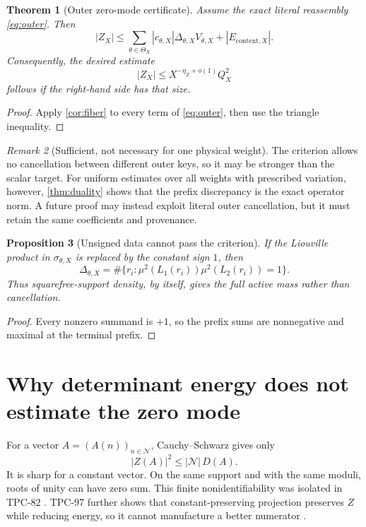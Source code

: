 \documentclass[11pt,a4paper]{article}
\newtheorem{theorem}{Theorem}[section]
\newtheorem{proposition}[theorem]{Proposition}
\theoremstyle{definition}
\theoremstyle{remark}
\newtheorem{remark}[theorem]{Remark}
\newcommand{\cN}{\mathcal N}
\begin{document}
\begin{theorem}[Outer zero-mode certificate]
\label{thm:outer}
Assume the exact literal reassembly \eqref{eq:outer}.  Then
\[
 \boxed{
 |Z_X|
 \le
 \sum_{\theta\in\Theta_X}
 |c_{\theta,X}|
 \Delta_{\theta,X}V_{\theta,X}
 +|E_{\mathrm{content},X}|.}
\]
Consequently, the desired estimate
\[
 |Z_X|\le X^{-\eta_Z+o(1)}Q_X^2
\]
follows if the right-hand side has that size.
\end{theorem}

\begin{proof}
Apply \cref{cor:fiber} to every term of
\eqref{eq:outer}, then use the triangle inequality.
\end{proof}

\begin{remark}[Sufficient, not necessary for one physical weight]
The criterion allows no cancellation between different outer keys,
so it may be stronger than the scalar target.  For uniform estimates
over all weights with prescribed variation, however,
\cref{thm:duality} shows that the prefix discrepancy is the exact
operator norm.  A future proof may instead exploit literal outer
cancellation, but it must retain the same coefficients and
provenance.
\end{remark}

\begin{proposition}[Unsigned data cannot pass the criterion]
\label{prop:unsigned}
If the Liouville product in \(\sigma_{\theta,X}\) is replaced by the
constant sign \(1\), then
\[
 \Delta_{\theta,X}
 =
 \#\{r_i:\mu^2(L_1(r_i))\mu^2(L_2(r_i))=1\}.
\]
Thus squarefree-support density, by itself, gives the full active
mass rather than cancellation.
\end{proposition}

\begin{proof}
Every nonzero summand is \(+1\), so the prefix sums are nonnegative
and maximal at the terminal prefix.
\end{proof}

\section{Why determinant energy does not estimate the zero mode}

For a vector \(A=(A(n))_{n\in\cN}\), Cauchy--Schwarz gives only
\[
 |Z(A)|^2\le|\cN|\,D(A).
\]
It is sharp for a constant vector.  On the same support and with the
same moduli, roots of unity can have zero sum.  This finite
nonidentifiability was isolated in TPC-82
\citep{WangTPC82}.  TPC-97 further shows that
constant-preserving projection preserves \(Z\) while reducing
energy, so it cannot manufacture a better numerator
\citep{WangTPC97}.
\end{document}
